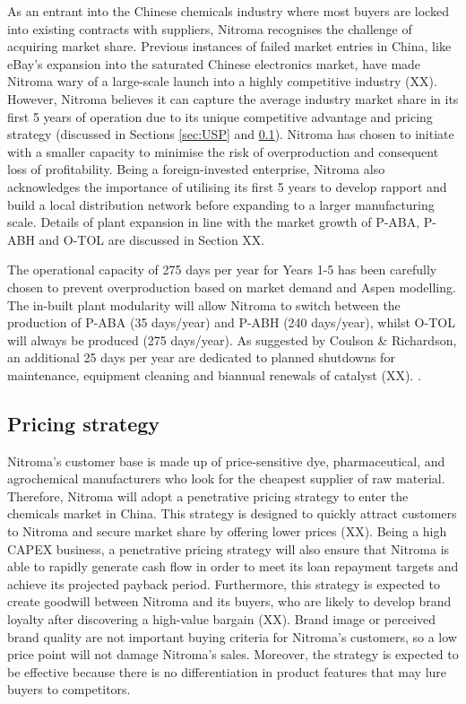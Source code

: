 As an entrant into the Chinese chemicals industry where most buyers are locked into existing contracts with suppliers, Nitroma recognises the challenge of acquiring market share. Previous instances of failed market entries in China, like eBay’s expansion into the saturated Chinese electronics market, have made Nitroma wary of a large-scale launch into a highly competitive industry (XX). However, Nitroma believes it can capture the average industry market share in its first 5 years of operation due to its unique competitive advantage and pricing strategy (discussed in Sections \ref{sec:USP} and \ref{sec:pricing-strategy}). Nitroma has chosen to initiate with a smaller capacity to minimise the risk of overproduction and consequent loss of profitability. Being a foreign-invested enterprise, Nitroma also acknowledges the importance of utilising its first 5 years to develop rapport and build a local distribution network before expanding to a larger manufacturing scale. Details of plant expansion in line with the market growth of P-ABA, P-ABH and O-TOL are discussed in Section XX.

The operational capacity of 275 days per year for Years 1-5 has been carefully chosen to prevent overproduction based on market demand and Aspen modelling. The in-built plant modularity will allow Nitroma to switch between the production of P-ABA (35 days/year) and P-ABH (240 days/year), whilst O-TOL will always be produced (275 days/year). As suggested by Coulson \& Richardson, an additional 25 days per year are dedicated to planned shutdowns for maintenance, equipment cleaning and biannual renewals of catalyst (XX). . 

\subsection{Pricing strategy}
\label{sec:pricing-strategy}
Nitroma’s customer base is made up of price-sensitive dye, pharmaceutical, and agrochemical manufacturers who look for the cheapest supplier of raw material. Therefore, Nitroma will adopt a penetrative pricing strategy to enter the chemicals market in China. This strategy is designed to quickly attract customers to Nitroma and secure market share by offering lower prices (XX). Being a high CAPEX business, a penetrative pricing strategy will also ensure that Nitroma is able to rapidly generate cash flow in order to meet its loan repayment targets and achieve its projected payback period. Furthermore, this strategy is expected to create goodwill between Nitroma and its buyers, who are likely to develop brand loyalty after discovering a high-value bargain (XX). Brand image or perceived brand quality are not important buying criteria for Nitroma’s customers, so a low price point will not damage Nitroma’s sales. Moreover, the strategy is expected to be effective because there is no differentiation in product features that may lure buyers to competitors.

